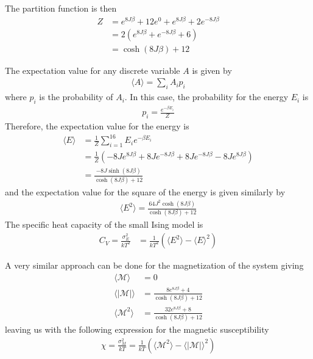 \documentclass[twoside, 11pt]{article}
\begin{document}
		The partition function is then
		\begin{align*}
			Z 	&= e^{8J\beta} + 12e^{0} + e^{8J\beta} + 2e^{-8J\beta} \\
				&= 2\left(e^{8J\beta} + e^{-8J\beta} + 6 \right) \\
				&= \cosh(8J\beta) + 12
		\end{align*}
		
		The expectation value for any discrete variable $A$ is  given by
		\begin{align*}
			\langle A \rangle = \sum_i A_ip_i
		\end{align*}
		where $p_i$ is the probability of $A_i$. In this case, the probability for the energy $E_i$ is
		\begin{align*}
			p_i = \frac{e^{-\beta E_i}}{Z}
		\end{align*}
		Therefore, the expectation value for the energy is 
		\begin{align}
			\langle E \rangle 	&= \frac{1}{Z}\sum_{i=1}^{16} E_i e^{-\beta E_i} \nonumber \\
										&= \frac{1}{Z}\left(-8Je^{8J\beta} + 8Je^{-8J\beta} + 8Je^{-8J\beta} - 8Je^{8J\beta} \right) \nonumber \\
										&= \frac{-8J\sinh(8J\beta)}{\cosh(8J\beta) + 12} \label{eq: L=2 theory <E>} 
		\end{align}
		and the expectation value for the square of the energy is given similarly by
		\begin{align*}
			\langle E^2 \rangle = \frac{64J^2\cosh(8J\beta)}{\cosh(8J\beta) + 12}
		\end{align*}
		The specific heat capacity of the small Ising model is 
		\begin{align}
			C_V = \frac{\sigma_E^2}{kT^2} &= \frac{1}{kT^2}\left(\langle E^2 \rangle - \langle E \rangle^2\right) \label{eq: L=2 theory C_V}
		\end{align}
	
	
		A very similar approach can be done for the magnetization of the system giving
		\begin{align*}
			\langle \mathcal{M} \rangle &= 0 \\
			\langle |\mathcal{M}| \rangle &= \frac{8e^{8J\beta} + 4}{\cosh(8J\beta) + 12} \\
			\langle \mathcal{M}^2 \rangle &= \frac{32e^{8J\beta} + 8}{\cosh(8J\beta) + 12}
		\end{align*}
		leaving us with the following expression for the magnetic susceptibility
		\begin{align}
			\chi = \frac{\sigma_M^2}{kT} = \frac{1}{kT}\left(\langle \mathcal{M}^2 \rangle - \langle |\mathcal{M}| \rangle ^2 \right) \label{eq: L=2 theory chi}
		\end{align}
\end{document}
